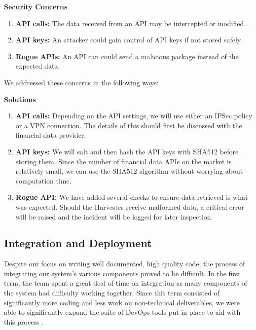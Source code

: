 \documentclass[main.tex]{subfiles}
\begin{document}
\newline
\textbf{Security Concerns}
\begin{enumerate}
    \item \textbf{API calls: }The data received from an API may be intercepted or modified.
    \item \textbf{API keys: }An attacker could gain control of API keys if not stored safely.
    \item \textbf{Rogue APIs: }An API can could send a malicious package instead of the expected data.
\end{enumerate}

We addressed these concerns in the following ways:

\textbf{Solutions}
\begin{enumerate}
    \item \textbf{API calls: }Depending on the API settings, we will use either an IPSec policy or a VPN connection. The details of this should first be discussed with the financial data provider.
    \item \textbf{API keys: }We will salt and then hash the API keys with SHA512 before storing them. Since the number of financial data APIs on the market is relatively small, we can use the SHA512 algorithm without worrying about computation time.
    \item \textbf{Rogue API: }We have added several checks to ensure data retrieved is what was expected. Should the Harvester receive malformed data, a critical error will be raised and the incident will be logged for later inspection. 
\end{enumerate}

\subsection{Integration and Deployment}
\label{Coding Standards}


Despite our focus on writing well documented, high quality code, the process of integrating our system's various components proved to be difficult. In the first term, the team spent a great deal of time on integration as many components of the system had difficulty working together. Since this term consisted of significantly more coding and less work on non-technical deliverables, we were able to significantly expand the suite of DevOps tools put in place to aid with this process \cite{DevOps}.
\end{document}
